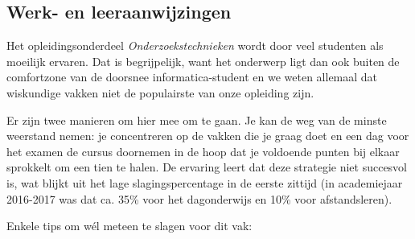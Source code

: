 \subsection{Werk- en leeraanwijzingen}

Het opleidingsonderdeel \emph{Onderzoekstechnieken} wordt door veel studenten als moeilijk ervaren. Dat is begrijpelijk, want het onderwerp ligt dan ook buiten de comfortzone van de doorsnee informatica-student en we weten allemaal dat wiskundige vakken niet de populairste van onze opleiding zijn.

Er zijn twee manieren om hier mee om te gaan. Je kan de weg van de minste weerstand nemen: je concentreren op de vakken die je graag doet en een dag voor het examen de cursus doornemen in de hoop dat je voldoende punten bij elkaar sprokkelt om een tien te halen. De ervaring leert dat deze strategie niet succesvol is, wat blijkt uit het lage slagingspercentage in de eerste zittijd (in academiejaar 2016-2017 was dat ca. 35\% voor het dagonderwijs en 10\% voor afstandsleren).

Enkele tips om wél meteen te slagen voor dit vak:

